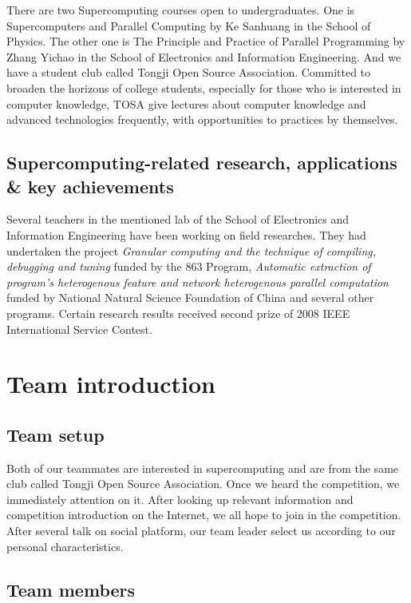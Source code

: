 \documentclass[a4paper, 11pt]{article}
\begin{document}
			There are two Supercomputing courses open to undergraduates. One is Supercomputers and Parallel Computing by Ke Sanhuang in the School of Physics. The other one is The Principle and Practice of Parallel Programming by Zhang Yichao in the School of Electronics and Information Engineering. And we have a student club called Tongji Open Source Association. Committed to broaden the horizons of college students, especially for those who is interested in computer knowledge, TOSA give lectures about computer knowledge and advanced technologies frequently, with opportunities to practices by themselves.
			
		\subsection{Supercomputing-related research, applications \\ \& key achievements}
		
			Several teachers in the mentioned lab of the School of Electronics and Information Engineering have been working on field researches. They had undertaken the project \textit{Granular computing and the technique of compiling, debugging and tuning} funded by the 863 Program, \textit{Automatic extraction of program's heterogenous feature and network  heterogenous parallel computation} funded by National Natural Science Foundation of China and several other programs. Certain research results received second prize of 2008 IEEE International Service Contest. 
			
	\section{Team introduction}
		\subsection{Team setup}
		
			Both of our teammates are interested in supercomputing and are from the same club called Tongji Open Source Association. Once we heard the competition, we immediately attention on it. After looking up relevant information and competition introduction on the Internet, we all hope to join in the competition. After several talk on social platform, our team leader select us according to our personal characteristics.
		
		\subsection{Team members} 
			
\end{document}
